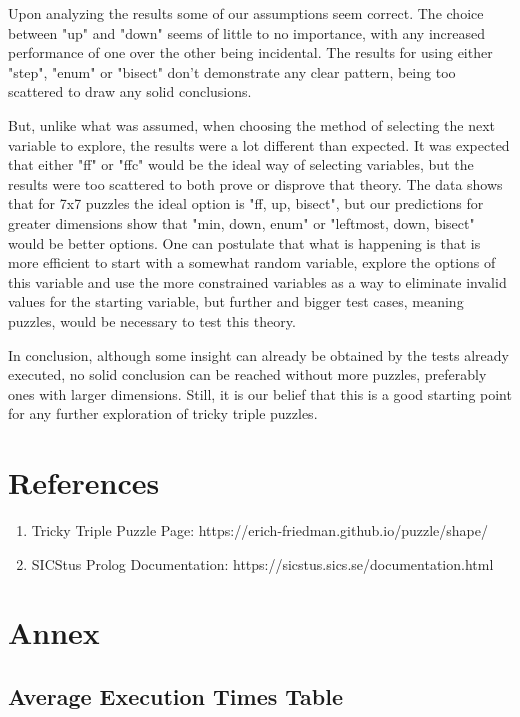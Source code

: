 \documentclass[runningheads]{llncs}
\begin{document}
Upon analyzing the results some of our assumptions seem correct.
The choice between "up" and "down" seems of little to no importance, with any increased
    performance of one over the other being incidental.
The results for using either "step", "enum" or "bisect" don't demonstrate any clear pattern,
    being too scattered to draw any solid conclusions.

But, unlike what was assumed, when choosing the method of selecting the next variable to explore,
    the results were a lot different than expected.
It was expected that either "ff" or "ffc" would be the ideal way of selecting variables,
    but the results were too scattered to both prove or disprove that theory.
The data shows that for 7x7 puzzles the ideal option is "ff, up, bisect",
    but our predictions for greater dimensions show that "min, down, enum" or
    "leftmost, down, bisect" would be better options.
One can postulate that what is happening is that is more efficient to start with
    a somewhat random variable, explore the options of this variable and use the more
    constrained variables as a way to eliminate invalid values for the starting variable,
    but further and bigger test cases, meaning puzzles, would be necessary to test this theory.

In conclusion, although some insight can already be obtained by the tests already executed,
    no solid conclusion can be reached without more puzzles, preferably ones with larger dimensions.
Still, it is our belief that this is a good starting point for any further exploration
    of tricky triple puzzles.

\section{References}
\begin{enumerate}
    \item Tricky Triple Puzzle Page: https://erich-friedman.github.io/puzzle/shape/
    \item SICStus Prolog Documentation: https://sicstus.sics.se/documentation.html
\end{enumerate}

\newpage
\section{Annex}

\subsection{Average Execution Times Table} \label{experiment-results}
\end{document}
